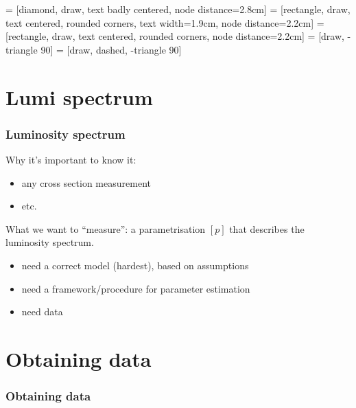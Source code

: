 \documentclass{beamer}
\begin{document}
 = [diamond, draw, text badly centered, node distance=2.8cm]
 = [rectangle, draw, text centered, rounded corners, text width=1.9cm, node distance=2.2cm]
 = [rectangle, draw, text centered, rounded corners, node distance=2.2cm]
 = [draw, -triangle 90]
 = [draw, dashed, -triangle 90]
\section{Lumi spectrum}
\begin{frame}
\frametitle{Luminosity spectrum}
Why it's important to know it:
\begin{itemize}
\item any cross section measurement
\item etc.
\end{itemize}
What we want to ``measure'': a parametrisation $[p]$ that describes the luminosity spectrum.
\begin{itemize}
\item need a correct model (hardest), based on assumptions
\item need a framework/procedure for parameter estimation
\item need data 
\end{itemize}
\end{frame}
\section{Obtaining data}
\begin{frame}
\frametitle{Obtaining data}
\begin{figure}[h]
\end{figure}
\end{frame}
\end{document}
